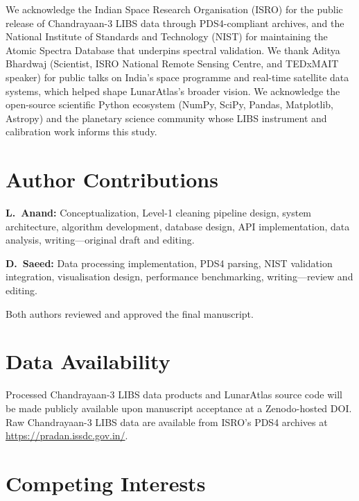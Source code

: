 \documentclass[a4paper,twocolumn,10pt]{article}
\begin{document}
We acknowledge the Indian Space Research Organisation (ISRO) for the
public release of Chandrayaan-3 LIBS data through PDS4-compliant
archives, and the National Institute of Standards and Technology
(NIST) for maintaining the Atomic Spectra Database that underpins
spectral validation.  We thank Aditya Bhardwaj (Scientist, ISRO
National Remote Sensing Centre, and TEDxMAIT speaker) for public
talks on India's space programme and real-time satellite data
systems, which helped shape LunarAtlas's broader vision.  We
acknowledge the open-source scientific Python ecosystem (NumPy,
SciPy, Pandas, Matplotlib, Astropy) and the planetary science
community whose LIBS instrument and calibration work informs this
study.


\section*{Author Contributions}

\textbf{L.~Anand:} Conceptualization, Level-1 cleaning pipeline
design, system architecture, algorithm development, database design,
API implementation, data analysis, writing---original draft and
editing.

\textbf{D.~Saeed:} Data processing implementation, PDS4 parsing,
NIST validation integration, visualisation design, performance
benchmarking, writing---review and editing.

Both authors reviewed and approved the final manuscript.


\section*{Data Availability}

Processed Chandrayaan-3 LIBS data products and LunarAtlas source code
will be made publicly available upon manuscript acceptance at a
Zenodo-hosted DOI.  Raw Chandrayaan-3 LIBS data are available from
ISRO's PDS4 archives at \url{https://pradan.issdc.gov.in/}.


\section*{Competing Interests}
\end{document}
